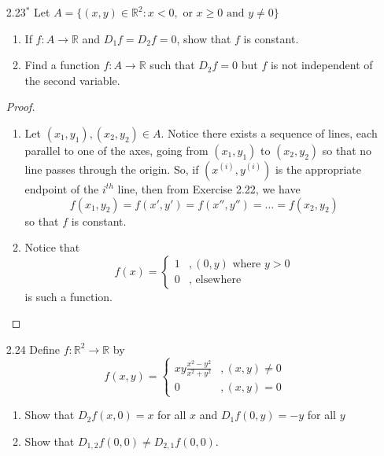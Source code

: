 \begin{enumerate}
    \item[2.23\(^*\)] Let \( A = \{ (x,y) \in \mathbb{R}^2: x<0, \text{ or } x \geq 0 \text{ and } y \neq 0 \} \)
    \begin{enumerate}
        \item If \( f:A \rightarrow \mathbb{R} \) and \( D_1f = D_2f = 0 \), show that \( f \) is constant. 
        
        \item Find a function \( f:A \rightarrow \mathbb{R} \) such that \( D_2f = 0 \) but \( f \) is not independent of the second variable.
    \end{enumerate}

    \begin{proof}
    \begin{enumerate}
        \item Let \( (x_1,y_1), (x_2,y_2) \in A \). Notice there exists a sequence of lines, each parallel to one of the axes, going from \( (x_1,y_1) \) to \( (x_2,y_2) \) so that no line passes through the origin. So, if \( (x^{(i)},y^{(i)}) \) is the appropriate endpoint of the \( i^{th} \) line, then from Exercise 2.22, we have
        \[
        f(x_1,y_2) = f(x',y') = f(x'',y'') = \ldots =  f(x_2,y_2)
        \]
        so that \( f \) is constant.
        
        \item Notice that
        \[
        f(x) = \begin{cases} 1 &, (0,y) \text{ where } y > 0 \\ 0 &, \text{ elsewhere }  \end{cases}
        \]
        is such a function.
    \end{enumerate}
    \end{proof}

    \item[2.24] Define \( f: \mathbb{R}^2 \rightarrow \mathbb{R} \) by
    \[
    f(x,y) = \begin{cases} xy \frac{x^2-y^2}{x^2+y^2} &, (x,y) \neq 0 \\ 0 &, (x,y) = 0 \end{cases}
    \]
    \begin{enumerate}
        \item Show that \( D_2f(x,0) = x \) for all \( x \) and \( D_1f(0,y) = -y \) for all \( y \)
        \item Show that \( D_{1,2}f(0,0) \neq D_{2,1}f(0,0)\).
    \end{enumerate}
    

\end{enumerate}
